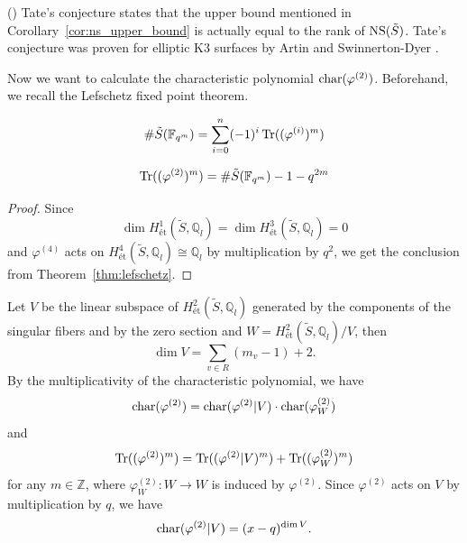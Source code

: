 \documentclass[main]{subfiles}
\begin{document}
\begin{rem}{(\cite[Remark 6.5.]{ref:vanluijk2007})}
    Tate's conjecture states that the upper bound mentioned in Corollary~\ref{cor:ns_upper_bound} is actually equal to the rank of $\operatorname{NS} (\tilde{S})$.
    Tate's conjecture was proven for elliptic K3 surfaces by Artin and Swinnerton-Dyer \cite{ref:Artin1973}.
\end{rem}

Now we want to calculate the characteristic polynomial $\operatorname{char} (\varphi^{(2)})$.
Beforehand, we recall the Lefschetz fixed point theorem.

\begin{thm}
    \label{thm:lefschetz}
    \begin{equation*}
        \# \tilde{S}(\mathbb{F}_{q^{m}}) = \sum_{i = 0}^{n} ( - 1)^{i} \operatorname{Tr}((\varphi^{(i)})^{m})
    \end{equation*}
\end{thm}

\begin{cor}
    \label{cor:lefschetz}
    \begin{equation*}
        \operatorname{Tr} ((\varphi^{(2)})^{m}) = \# \tilde{S}(\mathbb{F}_{q^{m}}) - 1 - q^{2m}
    \end{equation*}
\end{cor}
\begin{proof}
    Since
    \begin{equation*}
        \dim H_{\text{\'et}}^{1}(\tilde{S}, \mathbb{Q}_{l}) = \dim H_{\text{\'et}}^{3}(\tilde{S}, \mathbb{Q}_{l}) = 0
    \end{equation*}
    and $\varphi^{(4)}$ acts on $H_{\text{\'et}}^{4}(\tilde{S}, \mathbb{Q}_l) \cong \mathbb{Q}_l$ by multiplication by $q^{2}$,
    we get the conclusion from Theorem~\ref{thm:lefschetz}.
\end{proof}

Let $V$ be the linear subspace of $H_{\text{\'et}}^{2}(\tilde{S}, \mathbb{Q}_{l})$ generated by the components of the singular fibers and by the zero section and $W = H_{\text{\'et}}^{2}(\tilde{S}, \mathbb{Q}_l) / V$, then
\begin{equation}
    \label{eq:dimV}
    \dim V = \sum_{v \in R} (m_{v} - 1) + 2.
\end{equation}
By the multiplicativity of the characteristic polynomial, we have
\begin{equation*}
    \operatorname{char} (\varphi^{(2)}) = \operatorname{char} (\varphi^{(2)} | V) \cdot \operatorname{char} (\varphi^{(2)}_{W})
\end{equation*}
and
\begin{equation}
    \operatorname{Tr} ((\varphi^{(2)})^{m}) = \operatorname{Tr} ((\varphi^{(2)} | V)^{m}) + \operatorname{Tr} ((\varphi^{(2)}_{W})^{m}) \label{eq:trcomposition}
\end{equation}
for any $m \in \mathbb{Z}$, where $\varphi^{(2)}_W: W \to W$ is induced by $\varphi^{(2)}$.
Since $\varphi^{(2)}$ acts on $V$ by multiplication by $q$, we have
\begin{equation*}
    \operatorname{char} (\varphi^{(2)} | V) = (x - q)^{\dim V}.
\end{equation*}
\end{document}
